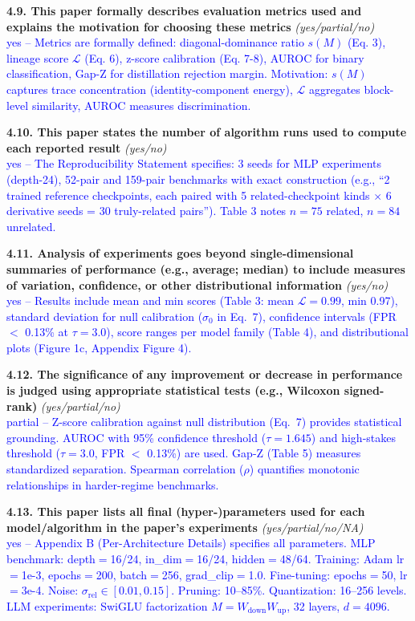\documentclass[letterpaper]{article}
\newcommand{\question}[3]{%
    \textbf{#1} \textit{#2}\\
    \textcolor{blue}{#3}\par
}
\begin{document}
\question{4.9. This paper formally describes evaluation metrics used and explains the motivation for choosing these metrics}
{(yes/partial/no)}
{yes -- Metrics are formally defined: diagonal-dominance ratio $s(M)$ (Eq. 3), lineage score $\mathcal{L}$ (Eq. 6), z-score calibration (Eq. 7-8), AUROC for binary classification, Gap-Z for distillation rejection margin. Motivation: $s(M)$ captures trace concentration (identity-component energy), $\mathcal{L}$ aggregates block-level similarity, AUROC measures discrimination.}

\question{4.10. This paper states the number of algorithm runs used to compute each reported result}
{(yes/no)}
{yes -- The Reproducibility Statement specifies: 3 seeds for MLP experiments (depth-24), 52-pair and 159-pair benchmarks with exact construction (e.g., ``2 trained reference checkpoints, each paired with 5 related-checkpoint kinds $\times$ 6 derivative seeds = 30 truly-related pairs''). Table 3 notes $n{=}75$ related, $n{=}84$ unrelated.}

\question{4.11. Analysis of experiments goes beyond single-dimensional summaries of performance (e.g., average; median) to include measures of variation, confidence, or other distributional information}
{(yes/no)}
{yes -- Results include mean and min scores (Table 3: mean $\mathcal{L}{=}0.99$, min 0.97), standard deviation for null calibration ($\sigma_0$ in Eq.\ 7), confidence intervals (FPR $<$ 0.13\% at $\tau{=}3.0$), score ranges per model family (Table 4), and distributional plots (Figure 1c, Appendix Figure 4).}

\question{4.12. The significance of any improvement or decrease in performance is judged using appropriate statistical tests (e.g., Wilcoxon signed-rank)}
{(yes/partial/no)}
{partial -- Z-score calibration against null distribution (Eq.\ 7) provides statistical grounding. AUROC with 95\% confidence threshold ($\tau{=}1.645$) and high-stakes threshold ($\tau{=}3.0$, FPR $<$ 0.13\%) are used. Gap-Z (Table 5) measures standardized separation. Spearman correlation ($\rho$) quantifies monotonic relationships in harder-regime benchmarks.}

\question{4.13. This paper lists all final (hyper-)parameters used for each model/algorithm in the paper's experiments}
{(yes/partial/no/NA)}
{yes -- Appendix B (Per-Architecture Details) specifies all parameters. MLP benchmark: depth$=$16/24, in\_dim$=$16/24, hidden$=$48/64. Training: Adam lr$=$1e-3, epochs$=$200, batch$=$256, grad\_clip$=$1.0. Fine-tuning: epochs$=$50, lr$=$3e-4. Noise: $\sigma_{\mathrm{rel}} \in [0.01, 0.15]$. Pruning: 10--85\%. Quantization: 16--256 levels. LLM experiments: SwiGLU factorization $M = W_{\mathrm{down}} W_{\mathrm{up}}$, 32 layers, $d{=}4096$.}
\end{document}
